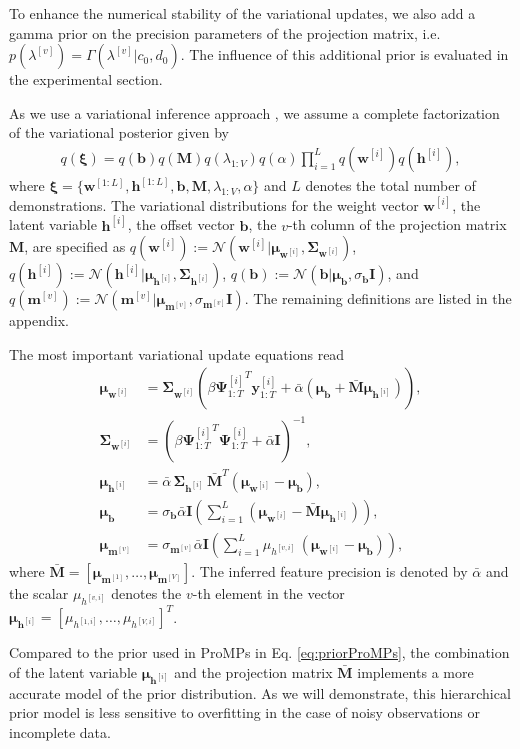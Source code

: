 \documentclass[letterpaper, 10 pt, conference]{ieeeconf}  %
\newcommand{\N}{\ensuremath{\mathcal{N}}}
\renewcommand{\vec}[1]{\ensuremath{\boldsymbol{#1}}}
\newcommand{\wi}{\ensuremath{\vec {w}^{[i]} }}
\newcommand{\Vwi}{\ensuremath{\vec \mu_{\vec {w}^{[i]}} }}
\newcommand{\VSi}{\ensuremath{\boldsymbol{\Sigma}_{\vec{w}^{[i]}} }}
\newcommand{\wo}{\ensuremath{\vec b }}
\newcommand{\Vwo}{\ensuremath{\vec \mu_{\vec b} }}
\newcommand{\Vlo}{\ensuremath{\sigma_{\vec b} }}
\newcommand{\WV}{\ensuremath{\vec M }}
\newcommand{\VWV}{\ensuremath{\bar{\vec M} }}
\newcommand{\wv}{\ensuremath{ \vec {m}^{[v]} }}
\newcommand{\lv}{\ensuremath{ {\lambda^{[v]}} }}
\newcommand{\Vwv}{\ensuremath{\vec {\mu}_{\vec{m}^{[v]}}}}
\newcommand{\Vwvel}[1]{\ensuremath{\vec {\mu}_{\vec{m}^{[#1]}}}}
\newcommand{\Vlv}{\ensuremath{\sigma_{\vec{m}^{[v]}}}}
\newcommand{\hi}{\ensuremath{\vec {h}^{[i]} }}
\newcommand{\Vhiv}{\ensuremath{\mu_{h^{[v,i]}} }}
\newcommand{\Vhivel}[1]{\ensuremath{\mu_{h^{[#1,i]}} }}
\newcommand{\Vhi}{\ensuremath{\vec {\mu}_{\vec {h}^{[i]}} }}
\newcommand{\Vgi}{\ensuremath{\boldsymbol{\Sigma}_{\vec {h}^{[i]}} }}
\newcommand{\ValphaN}{\ensuremath{\bar{\alpha} }}
\begin{document}
To enhance the numerical stability of the variational updates, we also 
add a gamma prior on the precision parameters of the projection matrix, i.e. $p(\lv)=\Gamma(\lv|c_0,d_0)$. 
The influence of this additional prior is evaluated in the experimental section. 

As we use a variational inference approach \cite{bishop06}, we assume a complete factorization of the variational posterior given by
\begin{align*}
 q(\vec \xi) = q(\wo) q(\WV) q(\lambda_{1:V}) q(\alpha) \prod_{i=1}^L q(\wi) q(\hi) ,
\end{align*}
where $\vec \xi=\{\vec w^{[1:L]}, \vec h^{[1:L]}, \wo, \WV, \lambda_{1:V}, \alpha \}$  
and $L$ denotes the total number of demonstrations. 
The variational distributions for 
the weight vector $\wi$, 
the latent variable $\hi$, 
the offset vector $\wo$, 
the $v$-th column of the projection matrix $\WV$, 
are specified as 
$q(\wi) := \N(\wi| \Vwi, \VSi)$,
$q(\hi) := \N(\hi| \Vhi, \Vgi)$, 
$q(\wo) := \N(\wo| \Vwo, \Vlo \vec I)$, and 
$q(\wv) := \N(\wv| \Vwv, \Vlv \vec I)$. 
The remaining definitions are listed in the appendix. 

The most important variational update equations read
\begin{align*}
 \Vwi &= \VSi \left( \beta {\vec \Psi_{1:T}^{[i]}}^T \vec y_{1:T}^{[i]} +
\ValphaN \left(\Vwo + \VWV \Vhi\right)\right), \\
 \VSi &= \left(\beta {\vec \Psi_{1:T}^{[i]}}^T \vec \Psi_{1:T}^{[i]} + \ValphaN
\vec I\right)^{-1}, \\
 \Vhi &= \ValphaN \, \Vgi \, \VWV^T  \left(\Vwi - \Vwo\right), \\
\Vwo &= \Vlo \ValphaN \vec I \left(\sum_{i=1}^L \left(\Vwi - \VWV
\Vhi\right)\right), \\
\Vwv &= \Vlv \ValphaN \vec I \left(\sum_{i=1}^L \Vhiv \, \left(\Vwi -
\Vwo\right)\right),
\end{align*}
where $\VWV = [\Vwvel{1}, \dots, \Vwvel{V}]$. 
The inferred feature precision is denoted by $\ValphaN$ and 
the scalar $\Vhiv$ denotes the $v$-th element in the vector $\Vhi = [\Vhivel{1}, \dots, \Vhivel{V}]^T$.

Compared to the prior used in ProMPs in Eq. \eqref{eq:priorProMPs}, 
the combination of the latent variable $\Vhi$ 
and the projection matrix $\VWV$ implements 
a more accurate model of the prior distribution.  
As we will demonstrate, this hierarchical prior model is 
less sensitive to overfitting in the case of noisy observations 
or incomplete data. 
\end{document}

